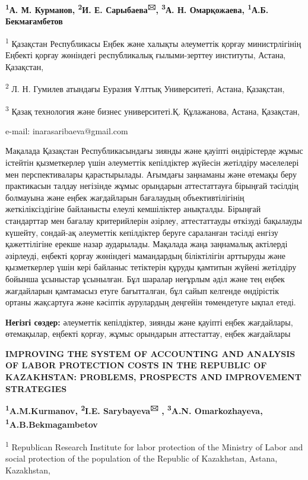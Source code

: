 {\bfseries \textsuperscript{1}А. М. Курманов, \textsuperscript{2}И. Е.
Сарыбаева\textsuperscript{🖂}, \textsuperscript{3}А. Н. Омарқожаева,
\textsuperscript{1}А.Б. Бекмағамбетов}

\textsuperscript{1} Қазақстан Республикасы Еңбек және халықты әлеуметтік
қорғау министрлігінің Еңбекті қорғау жөніндегі республикалық
ғылыми-зерттеу институты, Астана, Қазақстан,

\textsuperscript{2} Л. Н. Гумилев атындағы Еуразия Ұлттық Университеті,
Астана, Қазақстан,

\textsuperscript{3} Қазақ технология және бизнес университеті.Қ.
Құлажанова, Астана, Қазақстан,

e-mail: inarasaribaeva@gmail.com

Мақалада Қазақстан Республикасындағы зиянды және қауіпті өндірістерде
жұмыс істейтін қызметкерлер үшін әлеуметтік кепілдіктер жүйесін
жетілдіру мәселелері мен перспективалары қарастырылады. Ағымдағы
заңнаманы және өтемақы беру практикасын талдау негізінде жұмыс орындарын
аттестаттауға бірыңғай тәсілдің болмауына және еңбек жағдайларын
бағалаудың объективтілігінің жеткіліксіздігіне байланысты елеулі
кемшіліктер анықталды. Бірыңғай стандарттар мен бағалау критерийлерін
әзірлеу, аттестаттауды өткізуді бақылауды күшейту, сондай-ақ әлеуметтік
кепілдіктер беруге сараланған тәсілді енгізу қажеттілігіне ерекше назар
аударылады. Мақалада жаңа заңнамалық актілерді әзірлеуді, еңбекті қорғау
жөніндегі мамандардың біліктілігін арттыруды және қызметкерлер үшін кері
байланыс тетіктерін құруды қамтитын жүйені жетілдіру бойынша ұсыныстар
ұсынылған. Бұл шаралар неғұрлым әділ және тең еңбек жағдайларын
қамтамасыз етуге бағытталған, бұл сайып келгенде өндірістік ортаны
жақсартуға және кәсіптік аурулардың деңгейін төмендетуге ықпал етеді.

{\bfseries Негізгі сөздер:} әлеуметтік кепілдіктер, зиянды және қауіпті
еңбек жағдайлары, өтемақылар, еңбекті қорғау, жұмыс орындарын
аттестаттау, еңбек жағдайлары

{\bfseries IMPROVING THE SYSTEM OF ACCOUNTING AND ANALYSIS OF LABOR
PROTECTION COSTS IN THE REPUBLIC OF KAZAKHSTAN: PROBLEMS, PROSPECTS AND
IMPROVEMENT STRATEGIES}

{\bfseries \textsuperscript{1}A.M.Kurmanov, \textsuperscript{2}I.E.
Sarybayeva\textsuperscript{🖂} , \textsuperscript{3}A.N. Omarkozhayeva,
\textsuperscript{1}A.B.Bekmagambetov}

\textsuperscript{1} Republican Research Institute for labor protection
of the Ministry of Labor and social protection of the population of the
Republic of Kazakhstan, Astana, Kazakhstan,

